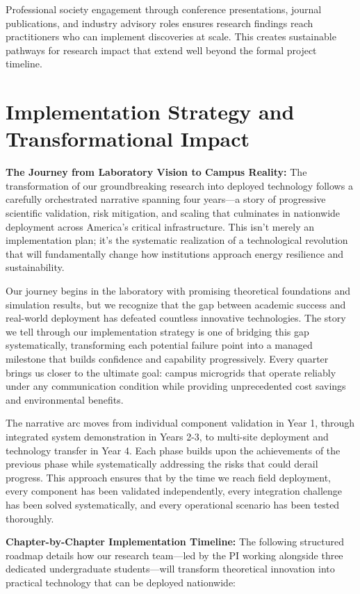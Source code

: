 \documentclass[12pt]{article}
\begin{document}
Professional society engagement through conference presentations, journal publications, and industry advisory roles ensures research findings reach practitioners who can implement discoveries at scale. This creates sustainable pathways for research impact that extend well beyond the formal project timeline.

\section{Implementation Strategy and Transformational Impact}

\textbf{The Journey from Laboratory Vision to Campus Reality:} The transformation of our groundbreaking research into deployed technology follows a carefully orchestrated narrative spanning four years—a story of progressive scientific validation, risk mitigation, and scaling that culminates in nationwide deployment across America's critical infrastructure. This isn't merely an implementation plan; it's the systematic realization of a technological revolution that will fundamentally change how institutions approach energy resilience and sustainability.

Our journey begins in the laboratory with promising theoretical foundations and simulation results, but we recognize that the gap between academic success and real-world deployment has defeated countless innovative technologies. The story we tell through our implementation strategy is one of bridging this gap systematically, transforming each potential failure point into a managed milestone that builds confidence and capability progressively. Every quarter brings us closer to the ultimate goal: campus microgrids that operate reliably under any communication condition while providing unprecedented cost savings and environmental benefits.

The narrative arc moves from individual component validation in Year 1, through integrated system demonstration in Years 2-3, to multi-site deployment and technology transfer in Year 4. Each phase builds upon the achievements of the previous phase while systematically addressing the risks that could derail progress. This approach ensures that by the time we reach field deployment, every component has been validated independently, every integration challenge has been solved systematically, and every operational scenario has been tested thoroughly.

\textbf{Chapter-by-Chapter Implementation Timeline:} The following structured roadmap details how our research team—led by the PI working alongside three dedicated undergraduate students—will transform theoretical innovation into practical technology that can be deployed nationwide:
\end{document}
